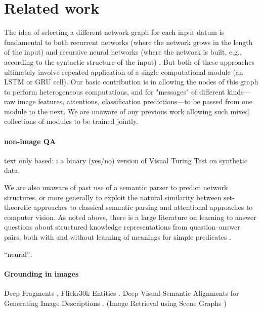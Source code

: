 \section{Related work}

The idea of selecting a different network graph for each input datum is fundamental to both recurrent networks (where the network grows in the length of the input) \cite{Elman90RNN} and recursive neural networks (where the network is built, e.g., according to the syntactic structure of the input) \cite{Socher13CVG}. But both of these approaches ultimately involve repeated application of a single computational module (\eg an LSTM \cite{} or GRU \cite{} cell). Our basic contribution is in allowing the nodes of this graph to perform heterogeneous computations, and for "messages" of different kinds---raw image features, attentions, classification predictions---to be passed from one module to the next. We are unaware of any previous work allowing such mixed collections of modules to be trained jointly. 

\paragraph{non-image QA}
text only based: \cite{berant14acl,Liang13DCS}i
\cite{geman15nas} a binary (yes/no) version of Visual Turing Test on synthetic data.

We are also unaware of past use of a semantic parser to predict network structures, or more generally to exploit the natural similarity between set-theoretic approaches to classical semantic parsing and attentional approaches to computer vision. As noted above, there is a large literature on learning to answer questions about structured knowledge representations from question--answer pairs, both with and without learning of meanings for simple predicates \cite{Liang13DCS,Krish2013Grounded}.

``neural'': \cite{iyyer14emnlp,weston14arxiv}

\paragraph{Grounding in images}
Deep Fragments \cite{karpathy14nips}, Flickr30k Entities \cite{plummer15iccv}.
Deep Visual-Semantic Alignments for Generating Image Descriptions \cite{karpathy15cvpr}.
(Image Retrieval using Scene Graphs \cite{johnson15cvpr})

\cite{Krish2013Grounded,matuszek12icml,kong14cvpr}

